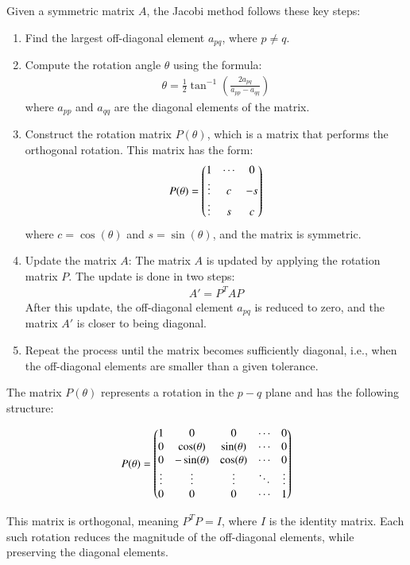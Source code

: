 \documentclass[journal]{IEEEtran}
\begin{document}
Given a symmetric matrix $A$, the Jacobi method follows these key steps:
\begin{enumerate}
    \item Find the largest off-diagonal element $ a_{pq}$, where $p \neq q$.
    \item Compute the rotation angle $\theta$ using the formula:
    \begin{align}
    \theta = \frac{1}{2} \tan^{-1}\left(\frac{2a_{pq}}{a_{pp} - a_{qq}}\right)
    \end{align}
    where $a_{pp} $ and $ a_{qq} $ are the diagonal elements of the matrix.
    \item Construct the rotation matrix $P(\theta)$, which is a matrix that performs the orthogonal rotation. This matrix has the form:
    \begin{align}
    P(\theta) =
    \begin{pmatrix}
    1 & \cdots & 0 \\
    \vdots & c & -s \\
    \vdots & s & c
    \end{pmatrix}
    \end{align}
    where $c = \cos(\theta)$ and $ s = \sin(\theta) $, and the matrix is symmetric.
    \item Update the matrix $A$: The matrix  $A$ is updated by applying the rotation matrix $P$. The update is done in two steps:
    \begin{align}
    A' = P^T A P
    \end{align}
    After this update, the off-diagonal element $a_{pq}$ is reduced to zero, and the matrix $A'$ is closer to being diagonal.
    \item Repeat the process until the matrix becomes sufficiently diagonal, i.e., when the off-diagonal elements are smaller than a given tolerance.
\end{enumerate}
The matrix $P(\theta)$ represents a rotation in the $p - q $ plane and has the following structure:

\begin{align}
P(\theta) = 
\begin{pmatrix}
1 & 0 & 0 & \cdots & 0 \\
0 & \cos(\theta) & \sin(\theta) & \cdots & 0 \\
0 & -\sin(\theta) & \cos(\theta) & \cdots & 0 \\
\vdots & \vdots & \vdots & \ddots & \vdots \\
0 & 0 & 0 & \cdots & 1
\end{pmatrix}
\end{align}

This matrix is orthogonal, meaning \( P^T P = I \), where $I$ is the identity matrix. Each such rotation reduces the magnitude of the off-diagonal elements, while preserving the diagonal elements. 
\end{document}
